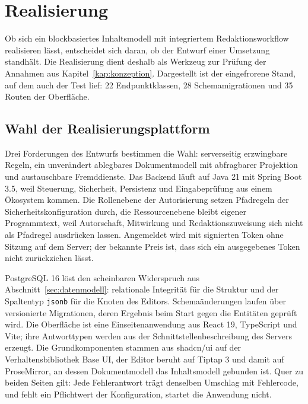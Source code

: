 
\chapter{Realisierung}
\label{kap:realisierung}

Ob sich ein blockbasiertes Inhaltsmodell mit integriertem Redaktionsworkflow realisieren lässt, entscheidet sich daran, ob der Entwurf einer Umsetzung standhält. Die Realisierung dient deshalb als Werkzeug zur Prüfung der Annahmen aus Kapitel~\ref{kap:konzeption}. Dargestellt ist der eingefrorene Stand, auf dem auch der Test lief: 22 Endpunktklassen, 28 Schemamigrationen und 35 Routen der Oberfläche.

\section{Wahl der Realisierungsplattform}
\label{sec:plattform}

Drei Forderungen des Entwurfs bestimmen die Wahl: serverseitig erzwingbare Regeln, ein unverändert ablegbares Dokumentmodell mit abfragbarer Projektion und austauschbare Fremddienste. Das Backend läuft auf Java 21 mit Spring Boot 3.5, weil Steuerung, Sicherheit, Persistenz und Eingabeprüfung aus einem Ökosystem kommen. Die Rollenebene der Autorisierung setzen Pfadregeln der Sicherheitskonfiguration durch, die Ressourcenebene bleibt eigener Programmtext, weil Autorschaft, Mitwirkung und Redaktionszuweisung sich nicht als Pfadregel ausdrücken lassen. Angemeldet wird mit signierten Token ohne Sitzung auf dem Server; der bekannte Preis ist, dass sich ein ausgegebenes Token nicht zurückziehen lässt.

PostgreSQL 16 löst den scheinbaren Widerspruch aus Abschnitt~\ref{sec:datenmodell}: relationale Integrität für die Struktur und der Spaltentyp \texttt{jsonb} für die Knoten des Editors. Schemaänderungen laufen über versionierte Migrationen, deren Ergebnis beim Start gegen die Entitäten geprüft wird. Die Oberfläche ist eine Einseitenanwendung aus React 19, TypeScript und Vite; ihre Antworttypen werden aus der Schnittstellenbeschreibung des Servers erzeugt. Die Grundkomponenten stammen aus shadcn/ui auf der Verhaltensbibliothek Base UI, der Editor beruht auf Tiptap 3 und damit auf ProseMirror, an dessen Dokumentmodell das Inhaltsmodell gebunden ist. Quer zu beiden Seiten gilt: Jede Fehlerantwort trägt denselben Umschlag mit Fehlercode, und fehlt ein Pflichtwert der Konfiguration, startet die Anwendung nicht.


